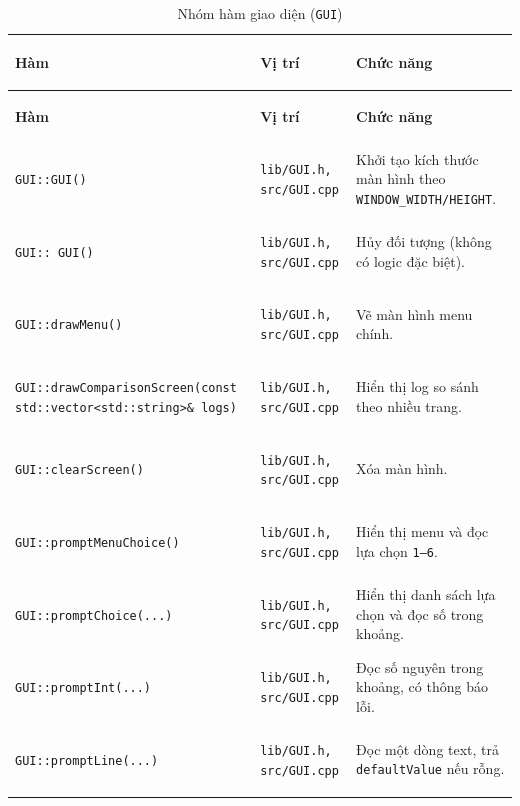 \documentclass[14pt,a4paper]{report}
\begin{document}
\begin{longtable}{|>{\bfseries\raggedright\arraybackslash}p{}|
                   >{\bfseries\raggedright\arraybackslash}p{2.8cm}|
                   >{\raggedright\arraybackslash}p{}|}
\caption{Nhóm hàm giao diện (\texttt{GUI})}\\
\hline
\rowcolor{headergray}
\color{white}\textbf{Hàm} & \color{white}\textbf{Vị trí} & \color{white}\textbf{Chức năng} \\
\hline
\endfirsthead

\hline
\rowcolor{headergray}
\color{white}\textbf{Hàm} & \color{white}\textbf{Vị trí} & \color{white}\textbf{Chức năng} \\
\hline
\endhead

\hline
\endfoot

\hline
\endlastfoot

\texttt{GUI::GUI()} &
\texttt{lib/GUI.h, src/GUI.cpp} &
Khởi tạo kích thước màn hình theo \texttt{WINDOW\_WIDTH/HEIGHT}.\\ \hline

\texttt{GUI::~GUI()} &
\texttt{lib/GUI.h, src/GUI.cpp} &
Hủy đối tượng (không có logic đặc biệt).\\ \hline

\texttt{GUI::drawMenu()} &
\texttt{lib/GUI.h, src/GUI.cpp} &
Vẽ màn hình menu chính.\\ \hline

\texttt{GUI::drawComparisonScreen(const std::vector<std::string>\& logs)} &
\texttt{lib/GUI.h, src/GUI.cpp} &
Hiển thị log so sánh theo nhiều trang.\\ \hline

\texttt{GUI::clearScreen()} &
\texttt{lib/GUI.h, src/GUI.cpp} &
Xóa màn hình.\\ \hline

\texttt{GUI::promptMenuChoice()} &
\texttt{lib/GUI.h, src/GUI.cpp} &
Hiển thị menu và đọc lựa chọn \texttt{1--6}.\\ \hline

\texttt{GUI::promptChoice(...)} &
\texttt{lib/GUI.h, src/GUI.cpp} &
Hiển thị danh sách lựa chọn và đọc số trong khoảng.\\ \hline

\texttt{GUI::promptInt(...)} &
\texttt{lib/GUI.h, src/GUI.cpp} &
Đọc số nguyên trong khoảng, có thông báo lỗi.\\ \hline

\texttt{GUI::promptLine(...)} &
\texttt{lib/GUI.h, src/GUI.cpp} &
Đọc một dòng text, trả \texttt{defaultValue} nếu rỗng.\\ \hline


\end{longtable}
\end{document}
